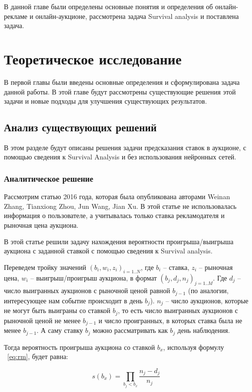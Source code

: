 \documentclass[times,specification,annotation]{itmo-student-thesis}
\begin{document}
В данной главе были определены основные понятия и определения об онлайн-рекламе и онлайн-аукционе, 
рассмотрена задача Survival analysis и поставлена задача.


\chapter{Теоретическое исследование}

В первой главы были введены основные определения и сформулирована задача данной работы. 
В этой главе будут рассмотрены существующие решения этой задачи и новые подходы для улучшения существующих результатов.

\section{Анализ существующих решений}

В этом разделе будут описаны решения задачи предсказания ставок в аукционе, 
с помощью сведения к Survival Analysis и без использования нейронных сетей.

\subsection{Аналитическое решение}

Рассмотрим статью 2016 года, которая была опубликована авторами Weinan Zhang, Tianxiong Zhou, Jun Wang, Jian Xu. 
В этой статье не использовалась информация о пользователе, а учитывалась только ставка рекламодателя и рыночная цена аукциона.

В этой статье решили задачу нахождения вероятности проигрыша/выигрыша аукциона с заданной ставкой с помощью сведения к Survival analysis.

Переведем тройку значений $(b_i, w_i, z_i )_{i=1..N}$, где $b_i$ – ставка, $z_i$ – рыночная цена, $w_i$ – выигрыш/проигрыш аукциона, 
в формат $(b_j,d_j,n_j )_{j=1..M}$. Где $d_j$ – число выигранных аукционов с рыночной ценой равной 
$b_{j-1}$ (по аналогии, интересующее нам событие происходит в день $b_j$). 
$n_j$ – число аукционов, которые не могут быть выиграны со ставкой $b_j$, 
то есть число выигранных аукционов с рыночной ценой не менее $b_{j-1}$ и число проигранных, 
в которых ставка была не менее $b_{j-1}$. А саму ставку $b_j$ можно рассматривать как $b_j$ день наблюдения.

Тогда вероятность проигрыша аукциона со ставкой $b_x$, используя формулу ~\ref{eq:rm}, будет равна:

\begin{equation}
    s(b_x) = \prod_{b_j < b_x} \frac{n_j - d_j}{n_j}
\end{equation}
\end{document}
